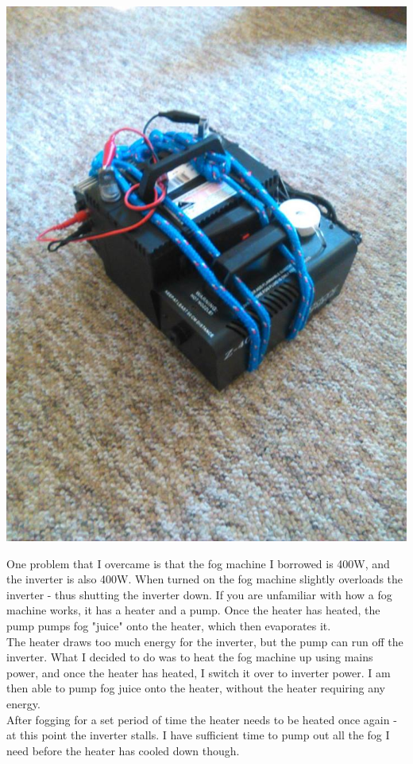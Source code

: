 			\centerline{\includegraphics[width=\linewidth]{images/PortaFog}}
			\pagebreak
			
			One problem that I overcame is that the fog machine I borrowed is 400W, and the inverter is also 400W. When turned on the fog machine slightly overloads the inverter - thus shutting the inverter down. If you are unfamiliar with how a fog machine works, it has a heater and a pump. Once the heater has heated, the pump pumps fog "juice" onto the heater, which then evaporates it.\\
			
			The heater draws too much energy for the inverter, but the pump can run off the inverter. What I decided to do was to heat the fog machine up using mains power, and once the heater has heated, I switch it over to inverter power. I am then able to pump fog juice onto the heater, without the heater requiring any energy.\\
			
			After fogging for a set period of time the heater needs to be heated once again - at this point the inverter stalls. I have sufficient time to pump out all the fog I need before the heater has cooled down though.\\
			
